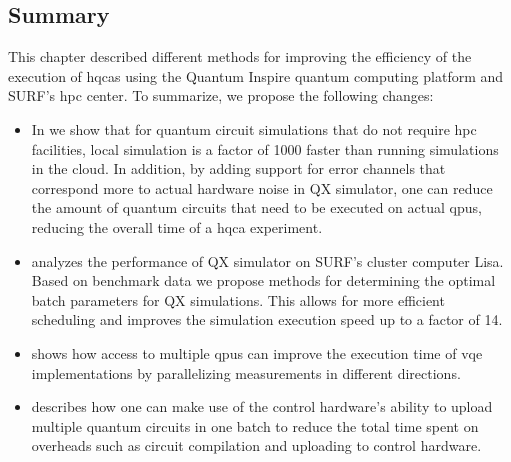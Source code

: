 \subsection{Summary}
This chapter described different methods for improving the efficiency of the execution of \glspl{hqca} using the Quantum Inspire quantum computing platform and SURF's \gls{hpc} center.
To summarize, we propose the following changes:
\begin{itemize}
    \item
    In  we show that for quantum circuit simulations that do not require \gls{hpc} facilities, local simulation is a factor of 1000 faster than running simulations in the cloud.
    In addition, by adding support for error channels that correspond more to actual hardware noise in QX simulator, one can reduce the amount of quantum circuits that need to be executed on actual \glspl{qpu}, reducing the overall time of a \gls{hqca} experiment.
    \item
     analyzes the performance of QX simulator on SURF's cluster computer Lisa.
    Based on benchmark data we propose methods for determining the optimal batch parameters for QX simulations.
    This allows for more efficient scheduling and improves the simulation execution speed up to a factor of 14.
    \item
     shows how access to multiple \glspl{qpu} can improve the execution time of \gls{vqe} implementations by parallelizing measurements in different directions.
    \item
     describes how one can make use of the control hardware's ability to upload multiple quantum circuits in one batch to reduce the total time spent on overheads such as circuit compilation and uploading to control hardware.
\end{itemize}
